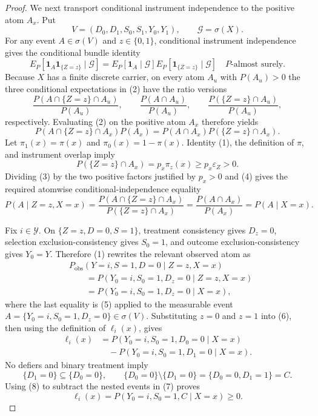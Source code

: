 \documentclass{article}
\begin{document}
\begin{proof}
We next transport conditional instrument independence to the positive atom \(A_x\).  Put
\[
V=(D_0,D_1,S_0,S_1,Y_0,Y_1),
\qquad \mathscr G=\sigma(X).
\]
For any event \(A\in\sigma(V)\) and \(z\in\{0,1\}\), conditional instrument independence gives the conditional bundle identity
\[
E_P\!\left[\mathbf 1_A\mathbf 1_{\{Z=z\}}\mid\mathscr G\right]
=E_P\!\left[\mathbf 1_A\mid\mathscr G\right]
 E_P\!\left[\mathbf 1_{\{Z=z\}}\mid\mathscr G\right]
\quad P\text{-almost surely}.
\tag{2}
\]
Because \(X\) has a finite discrete carrier, on every atom \(A_u\) with \(P(A_u)>0\) the three conditional expectations in (2) have the ratio versions
\[
\frac{P(A\cap\{Z=z\}\cap A_u)}{P(A_u)},
\qquad
\frac{P(A\cap A_u)}{P(A_u)},
\qquad
\frac{P(\{Z=z\}\cap A_u)}{P(A_u)},
\]
respectively.  Evaluating (2) on the positive atom \(A_x\) therefore yields
\[
P(A\cap\{Z=z\}\cap A_x)P(A_x)
=P(A\cap A_x)P(\{Z=z\}\cap A_x).
\tag{3}
\]
Let \(\pi_1(x)=\pi(x)\) and \(\pi_0(x)=1-\pi(x)\).  Identity (1), the definition of \(\pi\), and instrument overlap imply
\[
P(\{Z=z\}\cap A_x)=p_x\pi_z(x)
\ge p_x\varepsilon_Z>0.
\tag{4}
\]
Dividing (3) by the two positive factors justified by \(p_x>0\) and (4) gives the required atomwise conditional-independence equality
\[
P(A\mid Z=z,X=x)
=\frac{P(A\cap\{Z=z\}\cap A_x)}{P(\{Z=z\}\cap A_x)}
=\frac{P(A\cap A_x)}{P(A_x)}
=P(A\mid X=x).
\tag{5}
\]

Fix \(i\in\mathcal Y\).  On \(\{Z=z,D=0,S=1\}\), treatment consistency gives \(D_z=0\), selection exclusion-consistency gives \(S_0=1\), and outcome exclusion-consistency gives \(Y_0=Y\).  Therefore (1) rewrites the relevant observed atom as
\[
\begin{aligned}
&P_{\mathrm{obs}}(Y=i,S=1,D=0\mid Z=z,X=x)\\
&\qquad=P(Y_0=i,S_0=1,D_z=0\mid Z=z,X=x)\\
&\qquad=P(Y_0=i,S_0=1,D_z=0\mid X=x),
\end{aligned}
\tag{6}
\]
where the last equality is (5) applied to the measurable event \(A=\{Y_0=i,S_0=1,D_z=0\}\in\sigma(V)\).  Substituting \(z=0\) and \(z=1\) into (6), then using the definition of \(\ell_i(x)\), gives
\[
\begin{aligned}
\ell_i(x)
&=P(Y_0=i,S_0=1,D_0=0\mid X=x)\\
&\quad-P(Y_0=i,S_0=1,D_1=0\mid X=x).
\end{aligned}
\tag{7}
\]
No defiers and binary treatment imply
\[
\{D_1=0\}\subseteq\{D_0=0\},
\qquad
\{D_0=0\}\setminus\{D_1=0\}=\{D_0=0,D_1=1\}=C.
\tag{8}
\]
Using (8) to subtract the nested events in (7) proves
\[
\ell_i(x)=P(Y_0=i,S_0=1,C\mid X=x)\ge0.
\tag{9}
\]


\end{proof}
\end{document}
